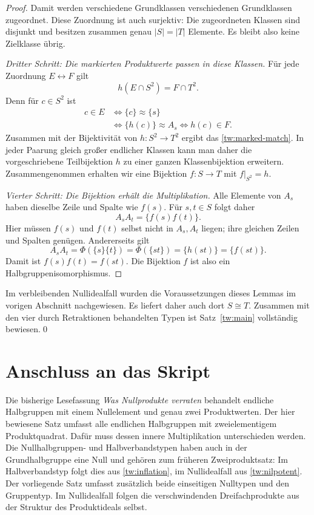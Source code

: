 \documentclass[a4paper,11pt]{article}
\begin{document}
\begin{proof}
Damit werden verschiedene Grundklassen verschiedenen Grundklassen
zugeordnet. Diese Zuordnung ist auch surjektiv: Die zugeordneten
Klassen sind disjunkt und besitzen zusammen genau \(|S|=|T|\)
Elemente. Es bleibt also keine Zielklasse übrig.

\emph{Dritter Schritt: Die markierten Produktwerte passen in diese
Klassen.} Für jede Zuordnung \(E\leftrightarrow F\) gilt
\begin{equation}\label{tw:marked-match}
 h(E\cap S^2)=F\cap T^2.
\end{equation}
Denn für \(c\in S^2\) ist
\[
 \begin{aligned}
 c\in E
 &\iff\{c\}\approx\{s\}\\
 &\iff\{h(c)\}\approx A_s
 \iff h(c)\in F.
 \end{aligned}
\]
Zusammen mit der Bijektivität von \(h:S^2\to T^2\) ergibt das
\eqref{tw:marked-match}. In jeder Paarung gleich großer endlicher
Klassen kann man daher die vorgeschriebene Teilbijektion \(h\) zu
einer ganzen Klassenbijektion erweitern. Zusammengenommen erhalten wir
eine Bijektion \(f:S\to T\) mit \(f|_{S^2}=h\).

\emph{Vierter Schritt: Die Bijektion erhält die Multiplikation.}
Alle Elemente von \(A_s\) haben dieselbe Zeile und Spalte wie
\(f(s)\). Für \(s,t\in S\) folgt daher
\[
 A_sA_t=\{f(s)f(t)\}.
\]
Hier müssen \(f(s)\) und \(f(t)\) selbst nicht in \(A_s,A_t\)
liegen; ihre gleichen Zeilen und Spalten genügen. Andererseits gilt
\[
 A_sA_t=\Phi(\{s\}\{t\})=\Phi(\{st\})
       =\{h(st)\}=\{f(st)\}.
\]
Damit ist \(f(s)f(t)=f(st)\). Die Bijektion \(f\) ist also ein
Halbgruppenisomorphismus.
\end{proof}

Im verbleibenden Nullidealfall wurden die Voraussetzungen dieses Lemmas
im vorigen Abschnitt nachgewiesen. Es liefert daher auch dort
\(S\cong T\). Zusammen mit den vier durch Retraktionen behandelten
Typen ist Satz~\ref{tw:main} vollständig bewiesen.\qed

\clearpage
\section*{Anschluss an das Skript}

Die bisherige Lesefassung \emph{Was Nullprodukte verraten} behandelt
endliche Halbgruppen mit einem Nullelement und genau zwei Produktwerten.
Der hier bewiesene Satz umfasst alle endlichen Halbgruppen mit
zweielementigem Produktquadrat. Dafür muss dessen innere Multiplikation
unterschieden werden. Die Nullhalbgruppen- und Halbverbandstypen haben
auch in der Grundhalbgruppe eine Null und gehören zum früheren
Zweiproduktsatz: Im Halbverbandstyp folgt dies aus
\eqref{tw:inflation}, im Nullidealfall aus \eqref{tw:nilpotent}.
Der vorliegende Satz umfasst zusätzlich beide einseitigen Nulltypen
und den Gruppentyp. Im Nullidealfall folgen die verschwindenden
Dreifachprodukte aus der Struktur des Produktideals selbst.
\end{document}
